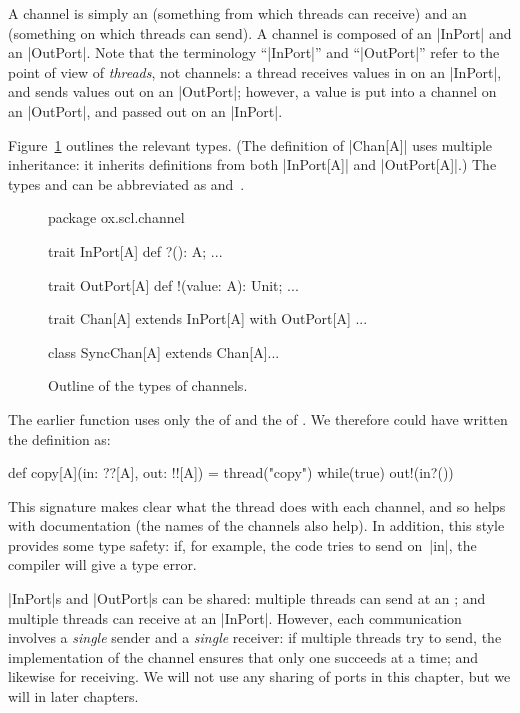 
A channel is simply an  (something from which threads can
receive) and an  (something on which threads can send).  A
channel is composed of an |InPort| and an |OutPort|.
Note that the terminology ``|InPort|'' and ``|OutPort|'' refer to the point of
view of \emph{threads}, not channels: a thread receives values in on an
|InPort|, and sends values out on an |OutPort|; however, a value is put into a
channel on an |OutPort|, and passed out on an |InPort|.

Figure~\ref{fig:channel-types} outlines the relevant types.  (The definition
of |Chan[A]| uses multiple inheritance: it inherits definitions from both
|InPort[A]| and |OutPort[A]|.)  The types  and
 can be abbreviated as  and~\SCALA{!![A]}.


\begin{figure}
\begin{scala}
package ox.scl.channel

trait InPort[A]{ def ?(): A; ... }
        
trait OutPort[A]{ def !(value: A): Unit; ... }
  
trait Chan[A] extends InPort[A] with OutPort[A]{ ... }

class SyncChan[A] extends Chan[A]{...} 
\end{scala}
\caption{Outline of the types of channels.}
\label{fig:channel-types}
\end{figure}


The earlier function  uses only the  of 
and the  of .  We therefore could have written the
definition as:
%
\begin{scala}
def copy[A](in: ??[A], out: !![A]) = thread("copy"){ 
  while(true) out!(in?()) 
}
\end{scala}
%
This signature makes clear what the thread does with each channel, and so
helps with documentation (the names of the channels also help).  In addition,
this style provides some  type safety: if, for example, the code tries to send
on~|in|, the compiler will give a type error. 

|InPort|s and |OutPort|s can be shared: multiple threads can send at an
; and multiple threads can receive at an |InPort|.  However,
each communication involves a \emph{single} sender and a \emph{single}
receiver: if multiple threads try to send, the implementation of the channel
ensures that only one succeeds at a time; and likewise for receiving.  We will
not use any sharing of ports in this chapter, but we will in later chapters.

